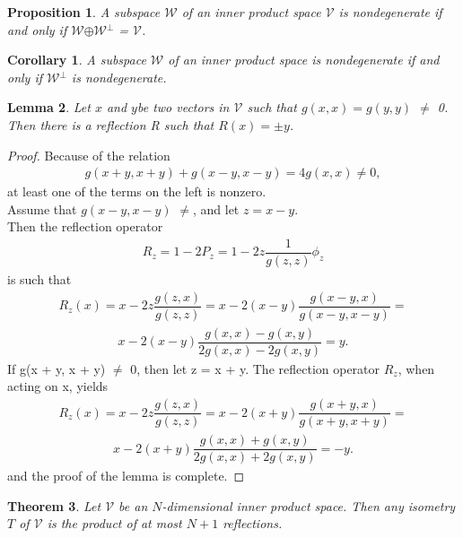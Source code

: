 \documentclass[12pt,a4paper]{article}
\newtheorem{thm}{Theorem}
\newtheorem{lem}[thm]{Lemma}
\newtheorem{cor}[thm]{Corollary}
\newtheorem{prop}{Proposition}
\begin{document}
\begin{prop}
A subspace $\mathcal{W}$ of an inner product space $\mathcal{V}$ is nondegenerate if and only if $\mathcal{W}$$\oplus$$\mathcal{W}$$^\perp$ = $\mathcal{V}$.
\end{prop}

\begin{cor}
A subspace $\mathcal{W}$ of an inner product space is nondegenerate if and only if $\mathcal{W}$$^\perp$ is nondegenerate.
\end{cor}
\begin{lem}
Let $x$ and $y $be two vectors in $\mathcal{V}$ such that $g(x, x) =
g(y, y)$ $\ne$ 0. \\Then there is a reflection R such that $R(x) = $$\pm y$.
\end{lem}
\begin{proof}
Because of the relation
\begin{align*}
g(x + y, x + y) + g(x -y, x - y) = 4g(x, x) \ne 0,
\end{align*}
at least one of the terms on the left is nonzero. \\Assume that $g(x -y, x - y)$ $\ne$, and let $z = x - y.$ \\Then the reflection operator
\begin{align*}
R_z = 1 - 2P_z = 1 - 2z \dfrac{1}{g(z, z)} \phi_z
\end{align*}
is such that 
\begin{align*}
R_z(x) = x - 2z\dfrac{g(z,x)}{g(z,z)} = x - 2(x-y)\dfrac{g(x - y, x)}{g(x - y, x -y)}=
\end{align*}
\begin{align*}
x - 2(x-y)\dfrac{g(x,x) - g(x, y)}{2g(x,x) - 2g(x,y)} = y.
\end{align*}
If g(x + y, x + y) $\neq$ 0, then let z = x + y. The reflection operator $R_z$, when acting on x, yields
\begin{align*}
R_z(x) = x - 2z\dfrac{g(z,x)}{g(z,z)} = x - 2(x + y)\dfrac{g(x+y,x)}{g(x+y, x+y)}=
\end{align*}
\begin{align*}
 x - 2(x+y)\dfrac{g(x,x) + g(x,y)}{2g(x,x) + 2g(x,y)} = -y.
\end{align*}
and the proof of the lemma is complete. 
\end{proof}
\begin{thm}
Let $\mathcal{V}$ be an $N$-dimensional inner product space.
Then any isometry $T$ of $\mathcal{V}$ is the product of at most $N + 1$ reflections.
\end{thm}
\end{document}
